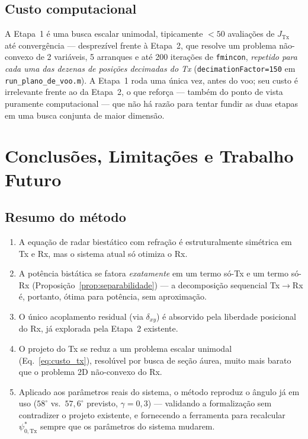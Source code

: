 \documentclass[12pt,a4paper,oneside]{book}
\theoremstyle{definition}
\theoremstyle{remark}
\newcommand{\dxy}{\delta_{xy}}
\newcommand{\psiT}{\psi_{0,\mathrm{Tx}}}
\begin{document}
\section{Custo computacional}

A Etapa~1 é uma busca escalar unimodal, tipicamente $<50$ avaliações de
$J_{\mathrm{Tx}}$ até convergência — desprezível frente à Etapa~2, que
resolve um problema não-convexo de 2 variáveis, 5 arranques e até 200
iterações de \texttt{fmincon}, \emph{repetido para cada uma das dezenas de
posições decimadas do Tx} (\texttt{decimationFactor=150} em
\texttt{run\_plano\_de\_voo.m}). A Etapa~1 roda uma única vez, antes do
voo; seu custo é irrelevante frente ao da Etapa~2, o que reforça —
também do ponto de vista puramente computacional — que não há razão para
tentar fundir as duas etapas em uma busca conjunta de maior dimensão.

\chapter{Conclusões, Limitações e Trabalho Futuro}

\section{Resumo do método}

\begin{enumerate}
  \item A equação de radar biestático com refração é estruturalmente
  simétrica em Tx e Rx, mas o sistema atual só otimiza o Rx.
  \item A potência bistática se fatora \emph{exatamente} em um termo
  só-Tx e um termo só-Rx (Proposição~\ref{prop:separabilidade}) — a
  decomposição sequencial Tx$\to$Rx é, portanto, ótima para potência, sem
  aproximação.
  \item O único acoplamento residual (via $\dxy$) é absorvido pela
  liberdade posicional do Rx, já explorada pela Etapa~2 existente.
  \item O projeto do Tx se reduz a um problema escalar unimodal
  (Eq.~\eqref{eq:custo_tx}), resolúvel por busca de seção áurea, muito
  mais barato que o problema 2D não-convexo do Rx.
  \item Aplicado aos parâmetros reais do sistema, o método reproduz o
  ângulo já em uso ($58^\circ$ vs.\ $57{,}6^\circ$ previsto, $\gamma=0{,}3$) —
  validando a formalização sem contradizer o projeto existente, e
  fornecendo a ferramenta para recalcular $\psiT^*$ sempre que os
  parâmetros do sistema mudarem.
\end{enumerate}
\end{document}
